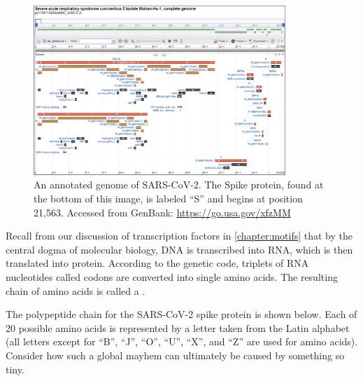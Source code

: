 \begin{figure}[h]
	\centering
	\mySfFamily
	\includegraphics[width = 0.85\textwidth]{../images/SARSCoV2Annotation.png}
	\caption{An annotated genome of SARS-CoV-2. The Spike protein, found at the bottom of this image, is labeled ``S'' and begins at position 21,563. Accessed from GenBank: \url{https://go.usa.gov/xfzMM}}
	\label{fig:SARSCoV2Annotation}
\end{figure}

Recall from our discussion of transcription factors in \autoref{chapter:motifs} that by the central dogma of molecular biology, DNA is transcribed into RNA, which is then translated into protein. According to the genetic code, triplets of RNA nucleotides called codons are converted into single amino acids. The resulting chain of amino acids is called a .

The polypeptide chain for the SARS-CoV-2 spike protein is shown below. Each of 20 possible amino acids is represented by a letter taken from the Latin alphabet (all letters except for ``B'', ``J'', ``O'', ``U'', ``X'', and ``Z'' are used for amino acids). Consider how such a global mayhem can ultimately be caused by something so tiny.

